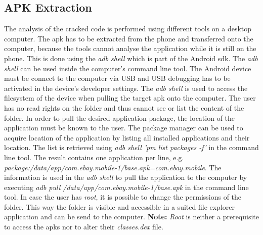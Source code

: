\subsection{APK Extraction} \label{subsection:tools-apk}
The analysis of the cracked code is performed using different tools on a desktop computer.
The \gls{apk} has to be extracted from the phone and transferred onto the computer, because the tools cannot analyse the application while it is still on the phone.
This is done using the \textit{adb shell} which is part of the Android \gls{sdk}.
\newline
The \textit{adb shell} can be used inside the computer's command line tool.
The Android device must be connect to the computer via USB and USB debugging has to be activated in the device's developer settings.
The \textit{adb shell} is used to access the filesystem of the device when pulling the target \gls{apk} onto the computer.
The user has no read rights on the folder and thus cannot see or list the content of the folder.
In order to pull the desired application package, the location of the application must be known to the user.
The package manager can be used to acquire location of the application by listing all installed applications and their location.
The list is retrieved using \textit{adb shell 'pm list packages -f'} in the command line tool.
The result contains one application per line, e.g. \textit{package:/data/app/com.ebay.mobile-1/base.apk=com.ebay.mobile}.
The information is used in the \textit{adb shell} to pull the application to the computer by executing \textit{adb pull /data/app/com.ebay.mobile-1/base.apk} in the command line tool.
\newline
In case the user has \textit{root}, it is possible to change the permissions of the folder.
This way the folder is visible and accessible in a suited file explorer application and can be send to the computer.
\newline
\newline
\textbf{Note:} \textit{Root} is neither a prerequisite to access the \gls{apk}s nor to alter their \textit{classes.dex} file.
